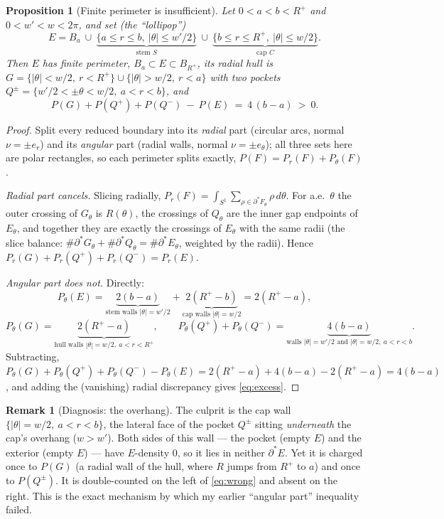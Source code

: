 \documentclass[11pt]{article}
\newtheorem{proposition}[theorem]{Proposition}
\theoremstyle{definition}
\newtheorem{remark}[theorem]{Remark}
\begin{document}
\begin{proposition}[Finite perimeter is insufficient]\label{prop:lollipop}
Let $0<a<b<R^+$ and $0<w'<w<2\pi$, and set (the ``lollipop'')
\[
   E=B_a\ \cup\ \underbrace{\{a\le r\le b,\ |\theta|\le w'/2\}}_{\text{stem }S}
   \ \cup\ \underbrace{\{b\le r\le R^+,\ |\theta|\le w/2\}}_{\text{cap }C}.
\]
Then $E$ has finite perimeter, $B_a\subset E\subset B_{R^+}$, its radial
hull is $G=\{|\theta|<w/2,\ r<R^+\}\cup\{|\theta|>w/2,\ r<a\}$ with two
pockets $Q^\pm=\{w'/2<\pm\theta<w/2,\ a<r<b\}$, and
\begin{equation}\label{eq:excess}
   P(G)+P(Q^+)+P(Q^-)\ -\ P(E)\ =\ 4\,(b-a)\ >\ 0 .
\end{equation}
\end{proposition}

\begin{proof}
Split every reduced boundary into its \emph{radial} part (circular arcs,
normal $\nu=\pm e_r$) and its \emph{angular} part (radial walls, normal
$\nu=\pm e_\theta$); all three sets here are polar rectangles, so each
perimeter splits exactly, $P(F)=P_r(F)+P_\theta(F)$.

\emph{Radial part cancels.} Slicing radially, $P_r(F)=\int_{S^1}\sum_{\rho
\in\partial^*F_\theta}\rho\,d\theta$. For a.e.\ $\theta$ the outer crossing
of $G_\theta$ is $R(\theta)$, the crossings of $Q_\theta$ are the inner
gap endpoints of $E_\theta$, and together they are exactly the crossings of
$E_\theta$ with the same radii (the slice balance: $\#\partial^*G_\theta+
\#\partial^*Q_\theta=\#\partial^*E_\theta$, weighted by the radii). Hence
$P_r(G)+P_r(Q^+)+P_r(Q^-)=P_r(E)$.

\emph{Angular part does not.} Directly:
\[
   P_\theta(E)=\underbrace{2(b-a)}_{\text{stem walls }|\theta|=w'/2}
              +\underbrace{2(R^+-b)}_{\text{cap walls }|\theta|=w/2}
              =2(R^+-a),
\]
\[
   P_\theta(G)=\underbrace{2(R^+-a)}_{\text{hull walls }|\theta|=w/2,\ a<r<R^+},
   \qquad
   P_\theta(Q^+)+P_\theta(Q^-)=\underbrace{4(b-a)}_{\text{walls }|\theta|=w'/2\text{ and }|\theta|=w/2,\ a<r<b}.
\]
Subtracting, $P_\theta(G)+P_\theta(Q^+)+P_\theta(Q^-)-P_\theta(E)=
2(R^+-a)+4(b-a)-2(R^+-a)=4(b-a)$, and adding the (vanishing) radial
discrepancy gives \eqref{eq:excess}.
\end{proof}

\begin{remark}[Diagnosis: the overhang]\label{rem:overhang}
The culprit is the cap wall $\{|\theta|=w/2,\ a<r<b\}$, the lateral face
of the pocket $Q^\pm$ sitting \emph{underneath} the cap's overhang
($w>w'$). Both sides of this wall --- the pocket (empty $E$) and the
exterior (empty $E$) --- have $E$-density $0$, so it lies in neither
$\partial^*E$. Yet it is charged once to $P(G)$ (a radial wall of the
hull, where $R$ jumps from $R^+$ to $a$) and once to $P(Q^\pm)$. It is
double-counted on the left of \eqref{eq:wrong} and absent on the right.
This is the exact mechanism by which my earlier ``angular part''
inequality failed.
\end{remark}
\end{document}
